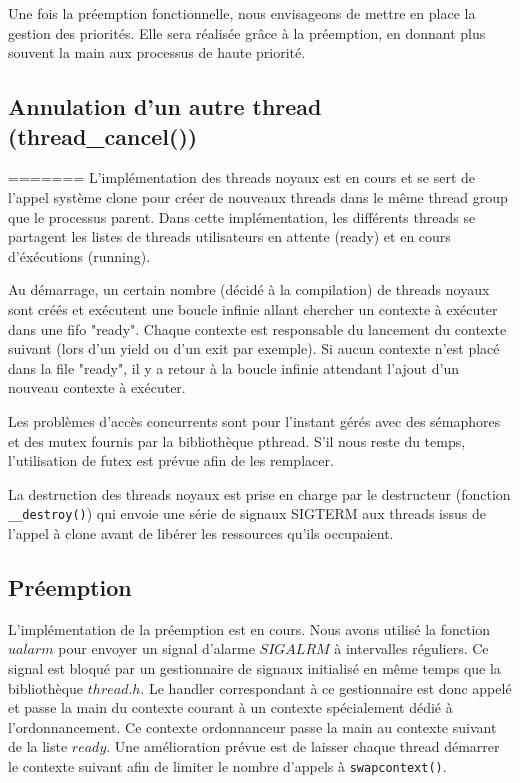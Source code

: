 Une fois la préemption fonctionnelle, nous envisageons de mettre en place la
gestion des priorités. Elle sera réalisée grâce à la préemption, en donnant
plus souvent la main aux processus de haute priorité.
 
\subsection{Annulation d'un autre thread (thread\_cancel())}
=======
L'implémentation des threads noyaux est en cours et se sert de l'appel système clone pour créer de nouveaux threads dans le même thread group que le processus parent. Dans cette implémentation, les différents threads se partagent les listes de threads utilisateurs en attente (ready) et en cours d'éxécutions (running).

Au démarrage, un certain nombre (décidé à la compilation) de threads noyaux sont créés et exécutent une boucle infinie allant chercher un contexte à exécuter dans une fifo "ready". Chaque contexte est responsable du lancement du contexte suivant (lors d'un yield ou d'un exit par exemple). Si aucun contexte n'est placé dans la file "ready", il y a retour à la boucle infinie attendant l'ajout d'un nouveau contexte à exécuter.

Les problèmes d'accès concurrents sont pour l'instant gérés avec des sémaphores et des mutex fournis par la bibliothèque pthread. S'il nous reste du temps, l'utilisation de futex est prévue afin de les remplacer.

La destruction des threads noyaux est prise en charge par le destructeur (fonction \verb!__destroy()!) qui envoie une série de signaux SIGTERM aux threads issus de l'appel à clone avant de libérer les ressources qu'ils occupaient.


\subsection{Préemption}
L'implémentation de la préemption est en cours. Nous avons utilisé la fonction $ualarm$ pour envoyer un signal d'alarme $SIGALRM$ à intervalles réguliers. Ce signal est bloqué par un gestionnaire de signaux initialisé en même temps que la bibliothèque $thread.h$. Le handler correspondant à ce gestionnaire est donc appelé et passe la main du contexte courant à un contexte spécialement dédié à l'ordonnancement. Ce contexte ordonnanceur passe la main au contexte suivant de la liste $ready$. Une amélioration prévue est de laisser chaque thread démarrer le contexte suivant afin de limiter le nombre d'appels à \verb!swapcontext()!.

